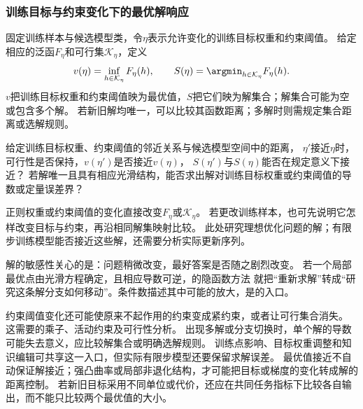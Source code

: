 \subsubsection{训练目标与约束变化下的最优解响应}
\label{sec:future-analysis-solution-sensitivity}

固定训练样本与候选模型类，令$\eta$表示允许变化的训练目标权重和约束阈值。
给定相应的泛函$F_\eta$和可行集$\mathcal K_\eta$，定义
\[
  v(\eta)=\inf_{h\in\mathcal K_\eta}F_\eta(h),\qquad
  S(\eta)=\argmin_{h\in\mathcal K_\eta}F_\eta(h).
\]
$v$把训练目标权重和约束阈值映为最优值，$S$把它们映为解集合；解集合可能为空或包含多个解。
若新旧解均唯一，可以比较其函数距离；多解时则需规定集合距离或选解规则。

\begin{mathproblem}[训练目标与约束变化造成的最优值与解集差异]
  \label{question:future-solution-sensitivity}
  给定训练目标权重、约束阈值的邻近关系与候选模型空间中的距离，
  $\eta'$接近$\eta$时，可行性是否保持，$v(\eta')$是否接近$v(\eta)$，
  $S(\eta')$与$S(\eta)$能否在规定意义下接近？
  若解唯一且具有相应光滑结构，能否求出解对训练目标权重或约束阈值的导数或定量误差界？
\end{mathproblem}

正则权重或约束阈值的变化直接改变$F_\eta$或$\mathcal K_\eta$。
若更改训练样本，也可先说明它怎样改变目标与约束，再沿相同解集映射比较。
此处研究理想优化问题的解；有限步训练模型能否接近这些解，还需要分析实际更新序列。

解的敏感性关心的是：问题稍微改变，最好答案是否随之剧烈改变。
若一个局部最优点由光滑方程确定，且相应导数可逆，的隐函数方法
就把“重新求解”转成“研究这条解分支如何移动”。条件数描述其中可能的放大，是的入口。

约束阈值变化还可能使原来不起作用的约束变成紧约束，或者让可行集合消失。
这需要的乘子、活动约束及可行性分析。
出现多解或分支切换时，单个解的导数可能失去意义，应比较解集合或明确选解规则。
训练点影响、目标权重调整和知识编辑可共享这一入口，但实际有限步模型还要保留求解误差。
最优值接近不自动保证解接近；强凸曲率或局部非退化结构，才可能把目标或梯度的变化转成解的距离控制。
若新旧目标采用不同单位或代价，还应在共同任务指标下比较各自输出，而不能只比较两个最优值的大小。

